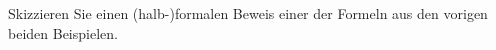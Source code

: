 
\begin{exercise}[109]

Skizzieren Sie einen (halb-)formalen Beweis einer der Formeln aus den vorigen
beiden Beispielen.
\end{exercise}


\begin{solution}

\phantom{}

\end{solution}

